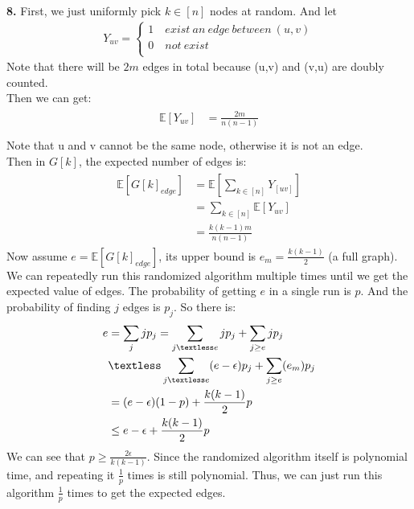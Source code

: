 \documentclass[titlepage, paper=a4, fontsize=11pt]{scrartcl} %
\numberwithin{equation}{section} %
\numberwithin{figure}{section} %
\numberwithin{table}{section} %
\begin{document}
\textbf{8.}
First, we just uniformly pick $k \in [n]$ nodes at random. And let
\begin{gather*}
Y_{uv} =
\begin{cases}
1 \quad exist\ an\ edge\ between\ (u,v) \\
0 \quad not\ exist \\
\end{cases}
\end{gather*}
Note that there will be $2m$ edges in total because (u,v) and (v,u) are doubly counted. \\
Then we can get:
\begin{align*} 
\begin{split}
\mathbb{E}[Y_{uv}] &= \frac{2m}{n(n-1)} \\
\end{split}					
\end{align*}
Note that u and v cannot be the same node, otherwise it is not an edge. \\
Then in $G[k]$, the expected number of edges is:
\begin{align*} 
\begin{split}
\mathbb{E}[G[k]_{edge}] &= \mathbb{E}[\sum_{k \in [n]} Y_[uv]] \\
&= \sum_{k \in [n]} \mathbb{E}[Y_{uv}] \\
&= \frac{k(k-1)m}{n(n-1)}
\end{split}					
\end{align*}
Now assume $e=\mathbb{E}[G[k]_{edge}]$, its upper bound is $e_m = \frac{k(k-1)}{2}$ (a full graph).
We can repeatedly run this randomized algorithm multiple times until we get the expected value of edges. The probability of getting $e$ in a single run is $p$. And the probability of finding $j$ edges is $p_j$.
So there is:
\begin{align*} 
\begin{split}
e &= \sum_{j}jp_j = \sum_{j \textless e}jp_j + \sum_{j \geq e}jp_j \\
&\textless \sum_{j \textless e}(e - \epsilon)p_j + \sum_{j \geq e}(e_m)p_j \\
&= (e-\epsilon)(1-p) + \frac{k(k-1)}{2}p \\
&\leq e - \epsilon + \frac{k(k-1)}{2}p
\end{split}					
\end{align*}
We can see that $p \geq \frac{2\epsilon}{k(k-1)}$. Since the randomized algorithm itself is polynomial time, and repeating it $\frac{1}{p}$ times is still polynomial. Thus, we can just run this algorithm $\frac{1}{p}$ times to get the expected edges.
\\
\end{document}
